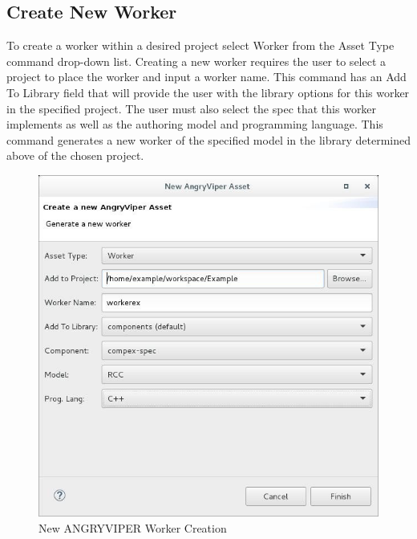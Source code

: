 \begin{flushleft}
\end{flushleft}

\newpage

\subsection{Create New Worker}
\label{sec:create_worker}
\begin{flushleft}

To create a worker within a desired project select Worker from the Asset Type command drop-down list. Creating a new worker requires the user to select a project to place the worker and input a worker name. This command has an Add To Library field that will provide the user with the library options for this worker in the specified project. The user must also select the spec that this worker implements as well as the authoring model and programming language. This command generates a new worker of the specified model in the library determined above of the chosen project.\newline
\begin{figure}[h!]
  \centering
  \includegraphics[scale=0.4]{figures/createworker.jpg}
  \caption{New ANGRYVIPER Worker Creation}
  \label{fig:figure10}
\end{figure}


\end{flushleft}
